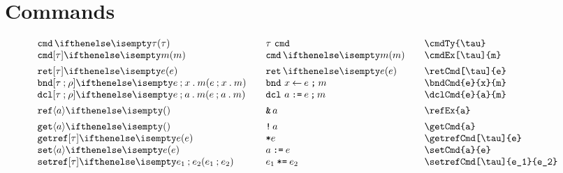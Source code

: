 \documentclass[11pt]{article}
\begin{document}
\section*{Commands\footnotemark}
\begin{small}
  \begin{displaymath}
    \begin{array}{l@{\qquad}l@{\qquad}l@{\qquad}l}
      \cmdTy{\tau}               & \cmdTy*{\tau}               & \verb|\cmdTy{\tau}|               \\
      \cmdEx[\tau]{m}            & \cmdEx*{m}                  & \verb|\cmdEx[\tau]{m}|            \\[1ex]
      \retCmd[\tau]{e}           & \retCmd*{e}                 & \verb|\retCmd[\tau]{e}|           \\
      \bndCmd{e}{x}{m}           & \bndCmd*{e}{x}{m}           & \verb|\bndCmd{e}{x}{m}|           \\
      \dclCmd{e}{a}{m}           & \dclCmd*{e}{a}{m}           & \verb|\dclCmd{e}{a}{m}|           \\[1ex]
      \refEx{a}                  & \refEx*{a}                  & \verb|\refEx{a}|                  \\[1ex]
      \getCmd{a}                 & \getCmd*{a}                 & \verb|\getCmd{a}|                 \\
      \getrefCmd[\tau]{e}        & \getrefCmd*{e}              & \verb|\getrefCmd[\tau]{e}|        \\
      \setCmd{a}{e}              & \setCmd*{a}{e}              & \verb|\setCmd{a}{e}|              \\
      \setrefCmd[\tau]{e_1}{e_2} & \setrefCmd*[\tau]{e_1}{e_2} & \verb|\setrefCmd[\tau]{e_1}{e_2}|
    \end{array}
  \end{displaymath}
\end{small}
\end{document}
